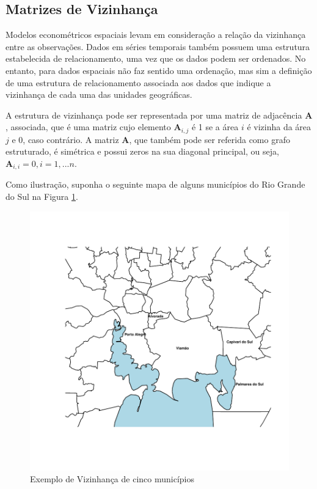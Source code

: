 \documentclass[12pt,openright,oneside,a4paper,english,french,spanish]{abntex2}
\numberwithin{table}{section} %
\numberwithin{figure}{section} %
\begin{document}
\subsection{Matrizes de Vizinhança\label{subsec:Matrizes_Indice}}

Modelos econométricos espaciais levam em consideração a relação da vizinhança entre as observações. Dados em séries temporais também possuem uma estrutura estabelecida de relacionamento, uma vez que os dados podem ser ordenados. No entanto, para dados espaciais não faz sentido uma ordenação, mas sim a definição de uma estrutura de relacionamento associada aos dados que indique a vizinhança de cada uma das unidades geográficas.

A estrutura de vizinhança pode ser representada por uma matriz de adjacência $\mathbf{A}$, associada, que é uma matriz cujo elemento $\mathbf{A}_{i,j}$ é 1 se a área $i$ é vizinha da área $j$ e 0, caso contrário. A matriz $\mathbf{A}$, que também pode ser referida como grafo estruturado, é simétrica e possui zeros na sua diagonal principal, ou seja, $\mathbf{A}_{i,i}=0, i=1,...n$.

Como ilustração, suponha o seguinte mapa de alguns municípios do Rio Grande do Sul na Figura \ref{fig:rmpa}.

\begin{figure}[H]
\begin{center}
\includegraphics{TESE_DE_DOUTORADO_RENAN_FINAL-plot1}
\end{center}
\caption{Exemplo de Vizinhança de cinco municípios}
\label{fig:rmpa}
\end{figure}
\end{document}
